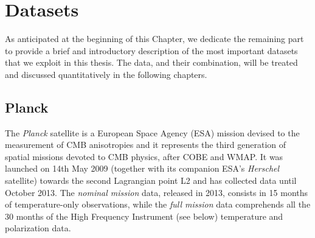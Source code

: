 \section{Datasets}
As anticipated at the beginning of this Chapter, we dedicate the remaining part to provide a brief and introductory description of the most important datasets that we exploit in this thesis. The data, and their combination, will be treated and discussed quantitatively in the following chapters. 

\label{sec:datasets}
\subsection{Planck}
The \textit{Planck} satellite is a European Space Agency (ESA) mission devised to the measurement of \gls{CMB} anisotropies and it represents the third generation of spatial missions devoted to \gls{CMB} physics, after COBE and WMAP. It was launched on 14th May 2009 (together with its companion ESA's \textit{Herschel} satellite) towards the second Lagrangian point L2 and has collected data until October 2013. The \emph{nominal mission} data, released in 2013, consists in 15 months of temperature-only observations, while the \emph{full mission} data comprehends all the 30 months of the High Frequency Instrument  (see below) temperature and polarization data. 

